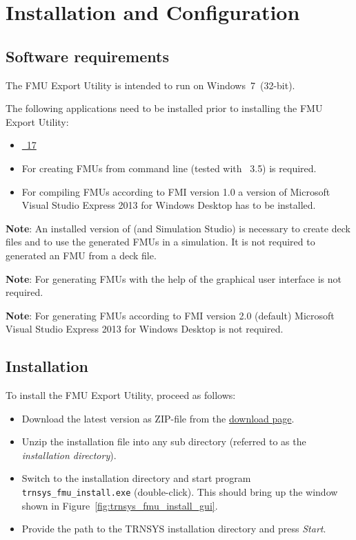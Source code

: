 \chapter{Installation and Configuration}

\section{Software requirements}

The \fmipp \trnsys FMU Export Utility is intended to run on Windows~7~(32-bit).

The following applications need to be installed prior to installing the \fmipp \trnsys FMU Export Utility:
\begin{itemize}

  \item \href{http://www.trnsys.com/}{\trnsys~17}

  \item For creating FMUs from command line \href{https://www.python.org/}{\python} (tested with \python~3.5) is required.

  \item For compiling FMUs according to FMI version 1.0 a version of Microsoft Visual Studio Express 2013 for Windows Desktop has to be installed.
\end{itemize}

\textbf{Note}: An installed version of \trnsys (and Simulation Studio) is necessary to create deck files and to use the generated FMUs in a simulation. It is not required to generated an FMU from a deck file.

\textbf{Note}: For generating FMUs with the help of the graphical user interface \python is not required.

\textbf{Note}: For generating FMUs according to FMI version 2.0 (default) Microsoft Visual Studio Express 2013 for Windows Desktop is not required.


\section{Installation}
\label{sec:install}

To install the \fmipp \trnsys FMU Export Utility, proceed as follows:
\begin{itemize}

  \item Download the latest version as ZIP-file from the \href{http://sourceforge.net/projects/trnsys-fmu/files/latest/download}{download page}.

  \item Unzip the installation file into any sub directory (referred to as the \emph{installation directory}).

  \item Switch to the installation directory and start program \texttt{trnsys\_fmu\_install.exe} (double-click).
  This should bring up the window shown in Figure~\ref{fig:trnsys_fmu_install_gui}.

  \item Provide the path to the TRNSYS installation directory and press \textit{Start}.

\end{itemize}

